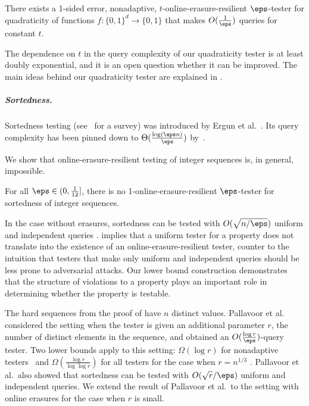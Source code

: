\documentclass{toc}
\begin{document}
\begin{theorem}\label{thm:quadraticity}
There exists a 1-sided error, nonadaptive, $t$-online-erasure-resilient $\eps$-tester for quadraticity of functions $f\colon \{0,1\}^d \to \{0,1\}$ that makes $O(\frac{1}{\eps})$ queries for constant $t$.
\end{theorem}

 The dependence on $t$ in the query complexity of our quadraticity tester is at least doubly exponential, and it is an open question whether it can be improved.
 The main ideas behind our quadraticity tester are explained in .





%
\subparagraph*{Sortedness.} Sortedness testing (see~\cite{Enc1} for a survey) was introduced by Ergun et al.~\cite{EKKRV00}.  Its query complexity has been pinned down to $\Theta(\frac{\log (\eps n)}{\eps})$ by~\cite{EKKRV00,Fis04, ChSe14,Belovs18}.


We show that online-erasure-resilient testing of integer sequences is, in general, impossible.
\begin{theorem}\label{thm:sortedness_real}
	For all $\eps \in (0,\frac{1}{12}]$, 
	there is no 1-online-erasure-resilient $\eps$-tester for sortedness of integer sequences.
\end{theorem}
In the case without erasures, sortedness can be tested with $O(\sqrt{n/\eps})$ uniform and independent queries \cite{FLNRRS02}.  implies that a uniform tester for a property does not translate into the existence of an online-erasure-resilient tester, counter to the intuition that testers that make only uniform and independent queries should be less prone to adversarial attacks. Our lower bound construction demonstrates that the structure of violations to a property plays an important role in determining whether the property is testable. 


The hard sequences from the proof of  have $n$ distinct values. Pallavoor et al. \cite{PRV18,Ramesh} considered the setting when the tester is given an additional parameter $r$, the number of distinct elements in the sequence, and obtained an $O(\frac{\log r}\eps)$-query tester. Two lower bounds apply to this setting: $\Omega(\log r)$ for nonadaptive testers~\cite{BlaRY14} and $\Omega(\frac{\log r}{\log \log r})$ for all testers for the case when $r=n^{1/3}$ \cite{Belovs18}. Pallavoor et al.\ also showed that
sortedness can be tested with $O(\sqrt{r}/\eps)$ uniform and independent queries. We extend the result of 
Pallavoor et al.\ to the setting with online erasures for the case when $r$ is small. 
\end{document}
